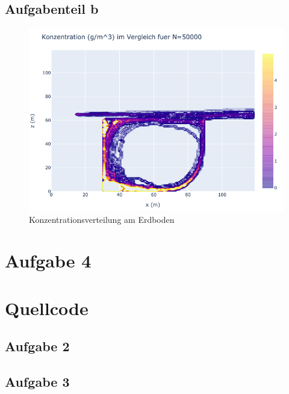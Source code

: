 \documentclass[ngerman]{scrartcl}
\begin{document}
\subsection{Aufgabenteil b}

\begin{figure}[H]
	\centering
	\includegraphics[scale=0.5]{Bilder/3k_xq=15.5.png}
	\caption{Konzentrationsverteilung am Erdboden}
	\label{fig:my_label}
\end{figure}
\section{Aufgabe  4}

\section{Quellcode}
\subsection{Aufgabe 2}

\subsection{Aufgabe 3}

\end{document}
